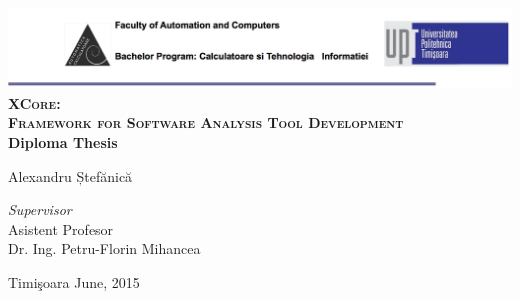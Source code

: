 \begin{titlepage}
	\begin{center}	
		\includegraphics[width=\textwidth]{../img/header.png}\\[4cm]
		
		{\huge \bfseries \textsc{XCore:\vspace{2.5mm}\\ Framework for
Software\vspace{2.5mm} Analysis Tool Development}}
		\\[3cm]
		
		{\bfseries Diploma Thesis} \\[3cm]
								
		\begin{flushright}
				\large Alexandru Ștefănică \\[1cm]
		\end{flushright}
		\begin{flushleft}
			 \large
				\emph{Supervisor} \\
				Asistent Profesor \\
				Dr. Ing. Petru-Florin Mihancea \\[1cm]
		\end{flushleft}
		
		{\large {Timi\c{s}oara June, 2015}}
	\end{center}
\end{titlepage}

